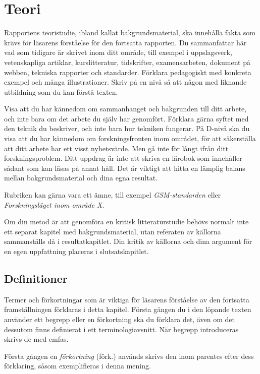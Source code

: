 \chapter{Teori}
\label{ch:theory}
\noindent
Rapportens teoristudie, ibland kallat bakgrundsmaterial, ska innehålla fakta 
som krävs för läsarens förståelse för den fortsatta rapporten.
Du sammanfattar här vad som tidigare är skrivet inom ditt område, till exempel
i uppslagsverk, vetenskapliga artiklar, kurslitteratur, tidskrifter, 
examensarbeten, dokument på webben, tekniska rapporter och standarder.
Förklara pedagogiskt med konkreta exempel och många illustrationer.
Skriv på en nivå så att någon med liknande utbildning som du kan förstå texten.

Visa att du har kännedom om sammanhanget och bakgrunden till ditt arbete, och 
inte bara om det arbete du själv har genomfört.
Förklara gärna syftet med den teknik du beskriver, och inte bara hur tekniken 
fungerar.
På D-nivå ska du visa att du har kännedom om forskningsfronten inom området, 
för att säkerställa att ditt arbete har ett visst nyhetsvärde.
Men gå inte för långt ifrån ditt forskningsproblem.
Ditt uppdrag är inte att skriva en lärobok som innehåller sådant som kan läsas 
på annat håll.
Det är viktigt att hitta en lämplig balans mellan bakgrundsmaterial och dina 
egna resultat.

Rubriken kan gärna vara ett ämne, till exempel \emph{GSM-standarden} eller 
\emph{Forskningsläget inom område X}.

Om din metod är att genomföra en kritisk litteraturstudie behövs normalt inte 
ett separat kapitel med bakgrundsmaterial, utan referaten av källorna 
sammanställs då i resultatkapitlet.
Din kritik av källorna och dina argument för en egen uppfattning placeras 
i slutsatskapitlet.


\section{Definitioner}
\label{sec:definitions}
\noindent
Termer och förkortningar som är viktiga för läsarens förståelse av den 
fortsatta framställningen förklaras i detta kapitel.
Första gången du i den löpande texten använder ett begrepp eller en förkortning 
ska du förklara det, även om det dessutom finns definierat i ett 
terminologiavsnitt.
När begrepp introduceras skrivs de med emfas.

Första gången en \emph{förkortning} (förk.) används skrivs den inom parentes 
efter dess förklaring, såsom exemplifieras i denna mening.

